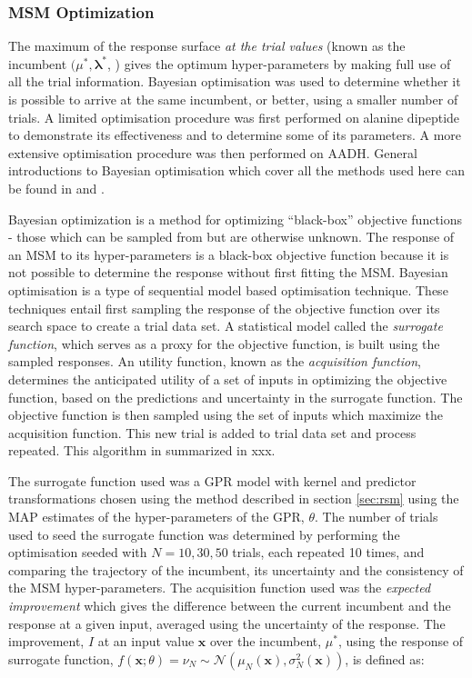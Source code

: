 \subsubsection{MSM Optimization}
The maximum of the response surface \emph{at the trial values} (known as the incumbent $(\mu^{*}, \mathbf{\lambda}^{*}$, \cite{shahriariTakingHumanOut}) gives the optimum hyper-parameters  by making full use of all the trial information. Bayesian optimisation was used to determine whether it is possible to arrive at the same incumbent, or better, using a smaller number of trials. A limited optimisation procedure was first performed on alanine dipeptide to demonstrate its effectiveness and to determine some of its parameters. A more extensive optimisation procedure was then performed on AADH. General introductions to Bayesian optimisation which cover all the methods used here can be found in \cite{snoekPracticalBayesianOptimization} and \cite{shahriariTakingHumanOut}. 

Bayesian optimization is a method for optimizing ``black-box'' objective functions - those which can be sampled from but are otherwise unknown. The response of an MSM to its hyper-parameters is a black-box objective function because it is not possible to determine the response without first fitting the MSM. Bayesian optimisation is a type of sequential model based \cite{hutterSequentialModelbasedOptimization2011} optimisation technique. These techniques entail first sampling the response of the objective function over its search space to create a trial data set. A statistical model called the \emph{surrogate function}, which serves as a proxy for the objective function, is built using the sampled responses. An utility function, known as the \emph{acquisition function}, determines the anticipated utility of a set of inputs in optimizing the objective function, based on the predictions and uncertainty in the surrogate function.  The objective function is then sampled using the set of inputs which maximize the acquisition function. This new trial is added to trial data set and process repeated. This algorithm in summarized in xxx. 

The surrogate function used was a GPR model with kernel and predictor transformations chosen using the method described in section \ref{sec:rsm} using the MAP estimates of the hyper-parameters of the GPR, $\theta$. The number of trials used to seed the surrogate function was determined by performing the optimisation seeded with $N=10, 30, 50$ trials, each repeated 10 times, and comparing the trajectory of the incumbent, its uncertainty and the consistency of the MSM hyper-parameters. The acquisition function used was the \emph{expected improvement} which gives the difference between the current incumbent and the  response at a given input, averaged using the uncertainty of the response. The improvement, $I$ at an input value $\mathbf{x}$ over the incumbent, $\mu^{*}$, using the response of surrogate function, $f(\mathbf{x}; \theta) = \nu_{N} \sim \mathcal{N}(\mu_{N}(\mathbf{x}), \sigma_N^{2}(\mathbf{x}))$, is defined as: 

